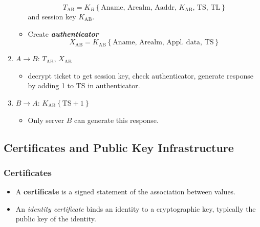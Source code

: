 \documentclass[twocolumn,landscape,10pt]{article}
\theoremstyle{definition}
\begin{document}
\begin{enumerate}
\begin{itemize}
                \[
                    T_\text{AB}=K_B\left\{\text{Aname, Arealm, Aaddr, $K_\text{AB}$, TS, TL}\right\}
                \]
                and session key $K_\text{AB}$.
            \item Create \textbf{\emph{authenticator}}
                \[
                    X_\text{AB}=K_\text{AB}\left\{\text{Aname, Arealm, Appl. data, TS}\right\}
                \]
        \end{itemize} 
    \item $A\rightarrow B$: $T_\text{AB}$, $X_\text{AB}$
        \begin{itemize}
            \item decrypt ticket to get session key, check authenticator,
                generate response by adding 1 to TS in authenticator.
        \end{itemize} 
    \item $B\rightarrow A$: $K_\text{AB}\left\{\text{TS} + 1\right\}$
        \begin{itemize}
            \item Only server $B$ can generate this response.
        \end{itemize} 
\end{enumerate} 


\subsection{Certificates and Public Key Infrastructure}

\subsubsection{Certificates}

\begin{itemize}
    \item A \textbf{certificate} is a signed statement of the association
        between values.
    \item An \emph{identity certificate} binds an identity to a cryptographic
        key, typically the public key of the identity.
\end{itemize} 
\end{document}
